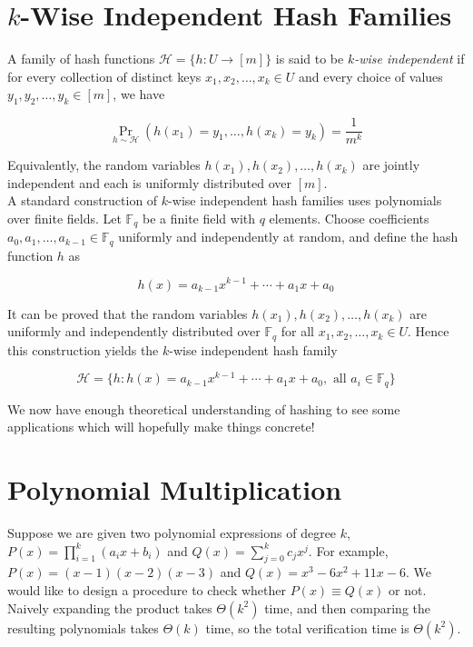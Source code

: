 \section{\texorpdfstring{$k$}{k}-Wise Independent Hash Families}


A family of hash functions $\mathcal H=\{h:U\to [m]\}$ is said to be \emph{$k$-wise independent} 
if for every collection of distinct keys $x_1,x_2,\dots,x_k\in U$ and every choice of 
values $y_1,y_2,\dots,y_k\in [m]$, we have

\[
\Pr_{h\sim\mathcal H}
\left(h(x_1)=y_1,\dots,h(x_k)=y_k\right)
=\frac1{m^k}
\]

Equivalently, the random variables $h(x_1),h(x_2),\dots,h(x_k)$ are jointly independent 
and each is uniformly distributed over $[m]$. \\


\noindent A standard construction of $k$-wise independent 
hash families uses polynomials over finite fields. Let $\mathbb F_q$ be a finite field with
$q$ elements. Choose coefficients $a_0,a_1,\dots,a_{k-1}\in\mathbb F_q$ uniformly and independently 
at random, and define the hash function $h$ as

\[
h(x)=a_{k-1}x^{k-1}+\cdots+a_1x+a_0
\]

It can be proved that the random variables $h(x_1),h(x_2),\dots,h(x_k)$ are uniformly and 
independently distributed over $\mathbb F_q$ for all $x_1,x_2,\dots,x_k\in U$. Hence this construction yields the $k$-wise independent 
hash family 

\[
\mathcal H=\{h:h(x)=a_{k-1}x^{k-1}+\cdots+a_1x+a_0, \text{ all } a_i \in \mathbb F_q\}
\]

We now have enough theoretical understanding of hashing to see some applications which will hopefully 
make things concrete!

\section{Polynomial Multiplication}

Suppose we are given two polynomial expressions of degree $k$, $P(x)=\prod_{i=1}^k (a_i x+b_i)$ and 
$Q(x) = \sum_{j=0}^k c_j x^j$. For example, $P(x)=(x-1)(x-2)(x-3)$ and $Q(x)=x^3-6x^2+11x-6$. We would 
like to design a procedure to check whether $P(x)\equiv Q(x)$ or not. Naively expanding the product 
takes $\Theta(k^2)$ time, and then comparing the resulting polynomials takes $\Theta(k)$ time, so the total 
verification time is $\Theta(k^2)$.\\


